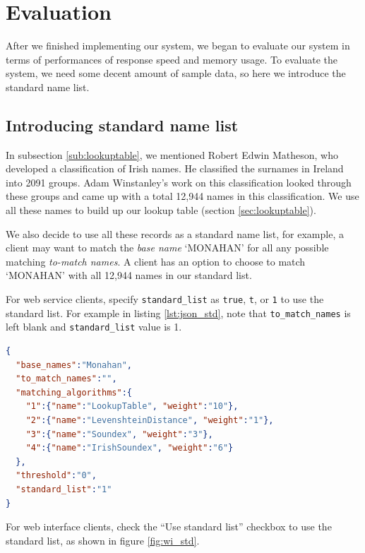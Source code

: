 \chapter{Evaluation}
\label{ch:evaluation}

After we finished implementing our system, we began to evaluate our system
in terms of performances of response speed and memory usage. To evaluate
the system, we need some decent amount of sample data, so here we
introduce the standard name list.

\section{Introducing standard name list}
\label{sec:stdname}

In subsection \ref{sub:lookuptable}, we mentioned Robert Edwin Matheson,
who developed a classification of Irish names. He classified
the surnames in Ireland into 2091 groups. Adam Winstanley's work
on this classification \cite[]{adamw} looked through these groups
and came up with a total 12,944 names in this classification.
We use all these names to build up our lookup table (section \ref{sec:lookuptable}).

We also decide to use all these records as a standard name list,
for example, a client may want to match the \emph{base name} `MONAHAN'
for all any possible matching \emph{to-match names}. A client has
an option to choose to match `MONAHAN' with all 12,944 names in
our standard list.

For web service clients, specify \texttt{standard\_list} as
\texttt{true}, \texttt{t}, or \texttt{1} to use the standard list.
For example in listing \ref{lst:json_std}, note that
\texttt{to\_match\_names} is left blank and \texttt{standard\_list} value is 1.

\begin{minipage}{\linewidth}
  \begin{lstlisting}[language={json}, label={lst:json_std}, caption={Sample \texttt{JSON} with a standard name list option.}]
{
  "base_names":"Monahan",
  "to_match_names":"",
  "matching_algorithms":{
    "1":{"name":"LookupTable", "weight":"10"},
    "2":{"name":"LevenshteinDistance", "weight":"1"},
    "3":{"name":"Soundex", "weight":"3"},
    "4":{"name":"IrishSoundex", "weight":"6"}
  },
  "threshold":"0",
  "standard_list":"1"
}
\end{lstlisting}
\end{minipage}

For web interface clients, check the ``Use standard list'' checkbox
to use the standard list, as shown in figure \ref{fig:wi_std}.

